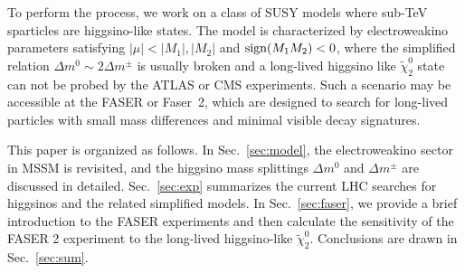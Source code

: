 \documentclass[letterpaper,11pt]{article}
\begin{document}
\par To perform the process, we work on a class of SUSY models where sub-TeV sparticles are higgsino-like states. The model is characterized by electroweakino parameters satisfying $|\mu| < |M_1|, |M_2|$ and ${\rm sign}(M_1 M_2) < 0$, where the simplified relation $\Delta m^0 \sim 2 \Delta m^\pm$ is usually broken and a long-lived higgsino like $\tilde{\chi}_2^0$ state can not be probed by the ATLAS or CMS experiments. Such a scenario may be accessible at the FASER or Faser~2, which are designed to search for long-lived particles with small mass differences and minimal visible decay signatures. 

\par This paper is organized as follows. 
In Sec.~\ref{sec:model}, the electroweakino sector in MSSM is revisited, and the higgsino mass splittings $\Delta m^0$ and $\Delta m^\pm$ are discussed in detailed. 
Sec.~\ref{sec:exp} summarizes the current LHC searches for higgsinos and the related simplified models. 
In Sec.~\ref{sec:faser}, we provide a brief introduction to the FASER experiments and then calculate the sensitivity of the FASER 2 experiment to the long-lived higgsino-like $\tilde{\chi}_2^0$.  
Conclusions are drawn in Sec.~\ref{sec:sum}.





\end{document}
